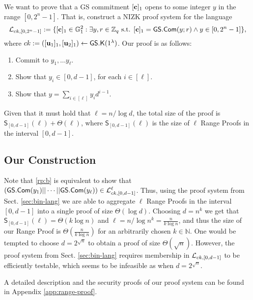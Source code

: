 We want to prove that a GS commitment $[\mathbf{c}]_1$ opens to some integer $y$ in the range $[0,2^n-1]$. That is, construct a NIZK proof system for the language
$$
\mathcal{L}_{ck,[0,2^n-1]} := \{[\mathbf{c}]_1\in\mathbb{G}_1^2: \exists y,r\in\mathbb{Z}_q\text{ s.t. }[\mathbf{c}]_1={\mathsf{GS}}.\mathsf{Com}(y;r)\wedge y\in[0,2^n-1]\},
$$
where $ck:=([\mathbf{u}_1]_1,[\mathbf{u}_2]_1)\gets{\mathsf{GS}}.\mathsf{K}(1^\lambda)$.
Our proof is as follows:
\begin{enumerate}[label=\alph*)]
\item Commit to $y_1,\ldots y_\ell$.
\item Show that $y_i\in[0,d-1]$, for each $i\in[\ell]$. \label{rp:b}
\item Show that $y=\sum_{i\in[\ell]}y_id^{i-1}$.
\end{enumerate}
Given that it must hold that $\ell=n/\log d$, the total size of the proof is $\mathsf{S}_{[0,d-1]}(\ell)+\Theta(\ell)$, where $\mathsf{S}_{[0,d-1]}(\ell)$ is the size of $\ell$ Range Proofs in the interval $[0,d-1]$.

\subsection{Our Construction}
Note that \ref{rp:b} is equivalent to show that $({\mathsf{GS}}.\mathsf{Com}(y_1)||\cdots||{\mathsf{GS}}.\mathsf{Com}(y_\ell))\in\mathcal{L}_{ck,[0,d-1]}^\ell$. Thus, using the proof system from Sect. \ref{sec:bin-lang} we are able to aggregate $\ell$ Range Proofs in the interval $[0,d-1]$ into a single proof of size $\Theta(\log d)$. Choosing $d=n^k$ we get that $\mathsf{S}_{[0,d-1]}(\ell)=\Theta(k\log n)$ and $\ell=n/\log n^k=\frac{n}{k\log n}$, and thus the size of our Range Proof is $\Theta(\frac{n}{k\log n})$ for an arbitrarily chosen $k\in\mathbb{N}$. One would be tempted to choose $d=2^{\sqrt{n}}$ to obtain a proof of size $\Theta(\sqrt{n})$. However, the proof system from Sect. \ref{sec:bin-lang} requires membership in $\mathcal{L}_{ck,[0,d-1]}$ to be efficiently testable, which seems to be infeasible as when $d=2^{\sqrt{n}}$.

A detailed description and the security proofs of our proof system can be found in Appendix \ref{app:range-proof}.
